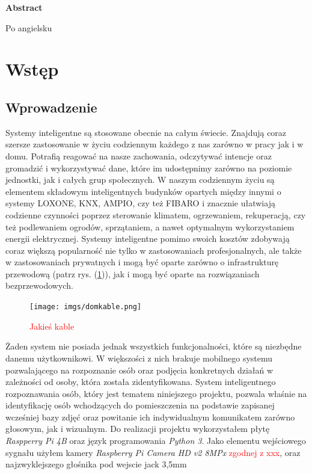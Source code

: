 \documentclass[a4paper,12pt,reqno]{article}
\begin{document}
\newpage
\begin{flushleft}
\Large \textbf{Abstract}
\end{flushleft}
\vspace{1cm}
Po angielsku

\newpage

\section{Wstęp}
\subsection{Wprowadzenie}
Systemy inteligentne są stosowane obecnie na całym świecie. Znajdują coraz szersze zastosowanie w życiu codziennym każdego z nas zarówno w pracy jak i w domu. Potrafią reagować na nasze zachowania, odczytywać intencje oraz gromadzić i wykorzystywać dane, które im udostępnimy zarówno na poziomie jednostki, jak i całych grup społecznych.
\newline
W naszym codziennym życiu są elementem składowym inteligentnych budynków opartych między innymi o systemy LOXONE, KNX, AMPIO, czy też FIBARO i znacznie ułatwiają codzienne czynności poprzez sterowanie klimatem, ogrzewaniem, rekuperacją, czy też podlewaniem ogrodów, sprzątaniem, a nawet optymalnym wykorzystaniem energii elektrycznej.
\newline
Systemy inteligentne pomimo swoich kosztów zdobywają coraz większą popularność nie tylko w zastosowaniach profesjonalnych, ale także w zastosowaniach prywatnych i mogą być oparte zarówno o infrastrukturę przewodową (patrz rys. (\ref{kable})), jak i mogą być oparte na rozwiązaniach bezprzewodowych.
\begin{figure}[!ht]%
\centering
\texttt{[image: imgs/domkable.png]}
\caption{\textcolor{red}{Jakieś kable} \label{kable}}
\quad
\end{figure}
\newline
Żaden system nie posiada jednak wszystkich funkcjonalności, które są niezbędne danemu użytkownikowi. W większości z nich brakuje mobilnego systemu pozwalającego na rozpoznanie osób oraz podjęcia konkretnych działań w zależności od osoby, która została zidentyfikowana.
\newline
System inteligentnego rozpoznawania osób, który jest tematem niniejszego projektu, pozwala właśnie na identyfikację osób wchodzących do pomieszczenia na podstawie zapisanej wcześniej bazy zdjęć oraz powitanie ich indywidualnym komunikatem zarówno głosowym, jak i wizualnym.
\newline
Do realizacji projektu wykorzystałem płytę \textit{Raspperry Pi 4B} \cite{RP4B} oraz język programowania \textit{Python 3}. Jako elementu wejściowego sygnału użyłem kamery \textit{Raspberry Pi Camera HD v2 8MPx} \textcolor{red}{zgodnej z xxx}, oraz najzwyklejszego głośnika pod wejscie jack 3,5mm
\end{document}

